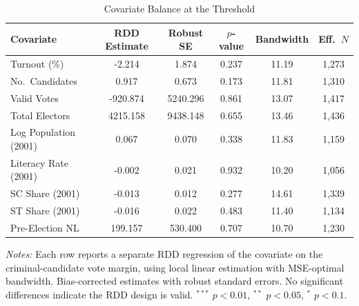 \begin{table}[htbp]
\centering
\caption{Covariate Balance at the Threshold}
\label{tab:covariate_balance}
\begin{tabular}{l ccccc}
\toprule
Covariate & RDD Estimate & Robust SE & $p$-value & Bandwidth & Eff.\ $N$ \\
\midrule
Turnout (\%)                   & -2.214 & 1.874 & 0.237 & 11.19 & 1,273 \\
No.\ Candidates                & 0.917 & 0.673 & 0.173 & 11.81 & 1,310 \\
Valid Votes                    & -920.874 & 5240.296 & 0.861 & 13.07 & 1,417 \\
Total Electors                 & 4215.158 & 9438.148 & 0.655 & 13.46 & 1,436 \\
Log Population (2001)          & 0.067 & 0.070 & 0.338 & 11.83 & 1,159 \\
Literacy Rate (2001)           & -0.002 & 0.021 & 0.932 & 10.20 & 1,056 \\
SC Share (2001)                & -0.013 & 0.012 & 0.277 & 14.61 & 1,339 \\
ST Share (2001)                & -0.016 & 0.022 & 0.483 & 11.40 & 1,134 \\
Pre-Election NL                & 199.157 & 530.400 & 0.707 & 10.70 & 1,230 \\
\bottomrule
\end{tabular}
\begin{minipage}{0.92\textwidth}
\vspace{4pt}
\footnotesize
\textit{Notes:} Each row reports a separate RDD regression of the covariate on the
criminal-candidate vote margin, using local linear estimation with MSE-optimal bandwidth.
Bias-corrected estimates with robust standard errors.
No significant differences indicate the RDD design is valid.
$^{***}$ $p<0.01$, $^{**}$ $p<0.05$, $^{*}$ $p<0.1$.
\end{minipage}
\end{table}
